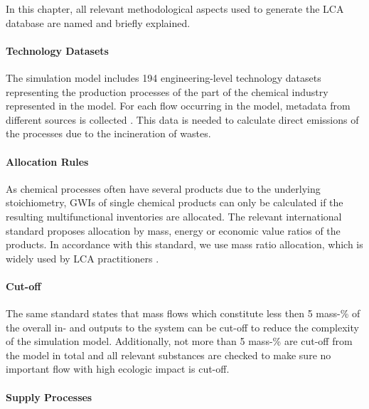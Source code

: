 In this chapter, all relevant methodological aspects used to generate the LCA database are named and briefly explained.


\paragraph{Technology Datasets}

The simulation model includes 194 engineering-level technology datasets representing the production processes of the part of the chemical industry represented in the model. For each flow occurring in the model, metadata from different sources is collected \cite{AmericanChemicalSociety.2020, Favre.2014, MerckKGaA.2020, RoyalSocietyofChemistry.2020}. This data is needed to calculate direct emissions of the processes due to the incineration of wastes.


\paragraph{Allocation Rules}

As chemical processes often have several products due to the underlying stoichiometry, \aclp{GWI} of single chemical products can only be calculated if the resulting multifunctional inventories are allocated. The relevant international standard \cite{InternationalOrganizationforStandardization.2006} proposes allocation by mass, energy or economic value ratios of the products. In accordance with this standard, we use mass ratio allocation, which is widely used by LCA practitioners \cite{EuropeanCommissionJointResearchCentreInstituteforEnvironmentandSustainability.2012c}.


\paragraph{Cut-off}
The same standard \cite{InternationalOrganizationforStandardization.2006} states that mass flows which constitute less then 5 mass-\% of the overall in- and outputs to the system can be cut-off to reduce the complexity of the simulation model. Additionally, not more than 5 mass-\% are cut-off from the model in total and all relevant substances are checked to make sure no important flow with high ecologic impact is cut-off.


\paragraph{Supply Processes}


